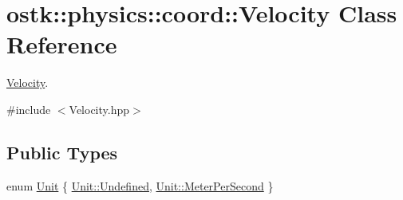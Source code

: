 \hypertarget{classostk_1_1physics_1_1coord_1_1_velocity}{}\section{ostk\+:\+:physics\+:\+:coord\+:\+:Velocity Class Reference}
\label{classostk_1_1physics_1_1coord_1_1_velocity}


\hyperlink{classostk_1_1physics_1_1coord_1_1_velocity}{Velocity}.  




{\ttfamily \#include $<$Velocity.\+hpp$>$}

\subsection*{Public Types}
\begin{DoxyCompactItemize}
\item 
enum \hyperlink{classostk_1_1physics_1_1coord_1_1_velocity_a01701e56094328a31d0211da5ac1ba28}{Unit} \{ \hyperlink{classostk_1_1physics_1_1coord_1_1_velocity_a01701e56094328a31d0211da5ac1ba28aec0fc0100c4fc1ce4eea230c3dc10360}{Unit\+::\+Undefined}, 
\hyperlink{classostk_1_1physics_1_1coord_1_1_velocity_a01701e56094328a31d0211da5ac1ba28a0af408165b5f88fcd7b687312b754ade}{Unit\+::\+Meter\+Per\+Second}
 \}
\end{DoxyCompactItemize}
